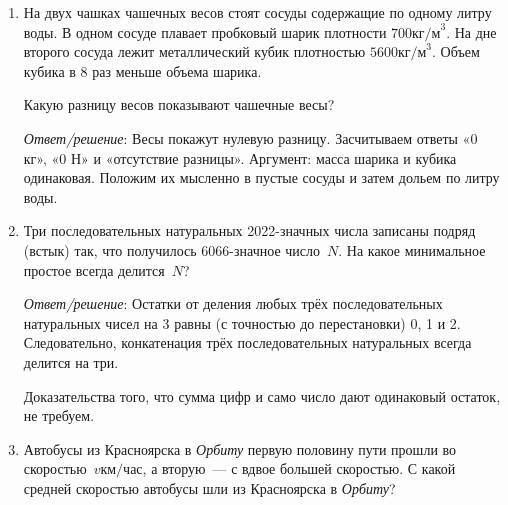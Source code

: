 \documentclass[12pt]{article} %
\begin{document}
\begin{enumerate}
\item %
На двух чашках чашечных весов стоят сосуды содержащие по одному литру воды. 
В одном сосуде плавает пробковый шарик плотности $700 \text{кг/м}^3$.
На дне второго сосуда лежит металлический кубик плотностью $5600 \text{кг/м}^3$.
Объем кубика в 8 раз меньше объема шарика. 

Какую разницу весов показывают чашечные весы?

\textsl{Ответ/решение}: 
Весы покажут нулевую разницу. Засчитываем ответы «0 кг», «0 Н» и «отсутствие разницы».
Аргумент: масса шарика и кубика одинаковая. Положим их мысленно в пустые сосуды и затем дольем по литру воды.

\item Три последовательных натуральных 2022-значных числа записаны подряд (встык) так, что получилось 6066-значное число~$N$. 
На какое минимальное простое всегда делится~$N$?

\textsl{Ответ/решение}: Остатки от деления любых трёх последовательных натуральных чисел на 3 равны (с точностью до перестановки) 0, 1 и 2. 
Следовательно, конкатенация трёх последовательных натуральных всегда делится на три.\bigskip

Доказательства того, что сумма цифр и само число дают одинаковый остаток, не требуем. 

\item Автобусы из Красноярска в \textit{Орбиту} первую половину пути прошли во скоростью~$v \text{км/час}$, а вторую~--- с вдвое большей скоростью. 
С какой средней скоростью автобусы шли из Красноярска в \textit{Орбиту}?


\end{enumerate}
\end{document}
